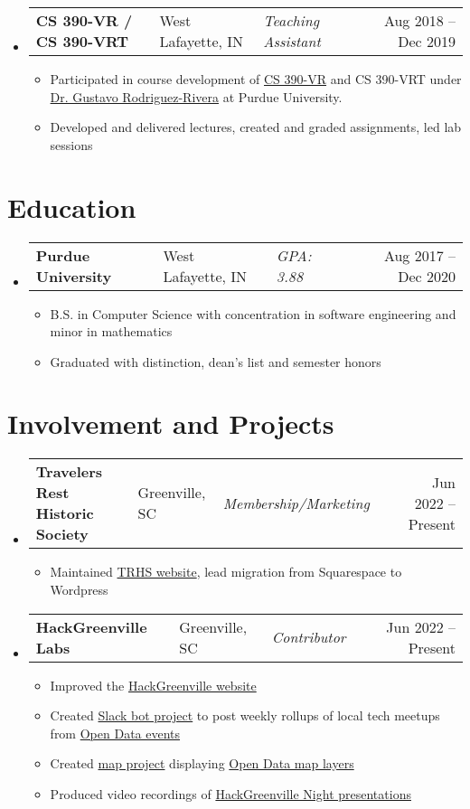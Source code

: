 \documentclass[11pt]{extarticle}
\makeatletter
\newcommand{\entry}[5]{
	\begin{tabularx}{\linewidth}{l@{, }l@{ – }lXr}
			\textbf{#1} & #2 & \lighttext \textit{#3} & & #4 – #5
	\end{tabularx}
	\vspace{-16pt}
}
\newcommand{\sectiontitle}[1]{
	\section*{\sectiontext #1}
	\vspace{-2pt}
}
\makeatother
\begin{document}
\begin{itemize}[leftmargin=1em]
	\item[]
	\entry{CS 390-VR / CS 390-VRT}{West Lafayette, IN}{Teaching Assistant}{Aug 2018}{Dec 2019}
	\begin{itemize}
		\item Participated in course development of
		\href{https://www.cs.purdue.edu/homes/cs390vr/}{CS 390-VR} and CS 390-VRT
		under \href{https://www.cs.purdue.edu/people/faculty/grr}{Dr. Gustavo
		Rodriguez-Rivera} at Purdue University.
		\item Developed and delivered lectures, created and graded assignments, led
		lab sessions
	\end{itemize}
\end{itemize}
\vspace{-20pt}

\sectiontitle{Education}
\begin{itemize}[leftmargin=1em]
	\item[]
	\entry{Purdue University}{West Lafayette, IN}{GPA: 3.88}{Aug 2017}{Dec 2020}
	\begin{itemize}
		\item B.S. in Computer Science with concentration in software engineering
		and minor in mathematics
		\item Graduated with distinction, dean's list and semester honors
	\end{itemize}
\end{itemize}
\vspace{-20pt}

\sectiontitle{Involvement and Projects}
\begin{itemize}[leftmargin=1em]
	\item[]
	\entry{Travelers Rest Historic Society}{Greenville, SC}{Membership/Marketing}{Jun 2022}{Present}
	\begin{itemize}
		\item Maintained \href{https://travelersresthistoricalsociety.org}{TRHS
		website}, lead migration from Squarespace to Wordpress
	\end{itemize}

	\item[]
	\entry{HackGreenville Labs}{Greenville, SC}{Contributor}{Jun 2022}{Present}
	\begin{itemize}
		\item Improved the \href{https://hackgreenville.com/}{HackGreenville
			website}
		\item Created \href{https://github.com/hackgvl/slack-events-bot}{Slack bot
			project} to post weekly rollups of local tech meetups from
			\href{https://github.com/hackgvl/OpenData}{Open Data events}
		\item Created
			\href{https://github.com/hackgvl/open-map-data-multi-layers-demo}{map
			project} displaying
			\href{https://github.com/hackgvl/OpenData}{Open Data map layers}
		\item Produced video recordings of
		\href{https://www.youtube.com/playlist?list=PL8vFrjH8DfOHLH2hc_g87jLyiUWoupFtx}{HackGreenville
		Night presentations}
	\end{itemize}
\end{itemize}
\vspace{-20pt}
\end{document}
